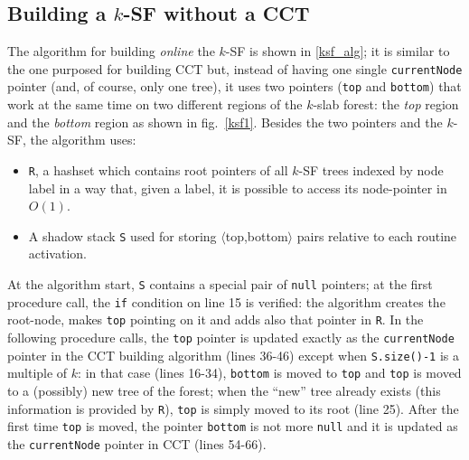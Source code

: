 \documentclass[a4paper,10pt]{report}
\begin{document}
\subsection{Building a $k$-SF without a CCT}

The algorithm for building \emph{online} the $k$-SF is shown in \cref{ksf_alg}; 
it is similar to the one purposed for building CCT but, instead of having 
one single \verb|currentNode| pointer (and, of course, only one tree), 
it uses two pointers (\verb|top| and \verb|bottom|) that work at the same time 
on two different regions of the $k$-slab forest: 
the \emph{top} region and the \emph{bottom} region as shown in fig.~\ref{ksf1}.
Besides the two pointers and the $k$-SF, the algorithm uses:

\begin{itemize}
\item \verb|R|, a hashset which contains root pointers of all $k$-SF trees indexed by node label in a way that, given a label, it is possible to access its node-pointer in $O(1)$.

\item A shadow stack \verb|S| used for storing $\langle$top,bottom$\rangle$ pairs relative to each routine activation. 
\end{itemize}

\noindent
At the algorithm start, \verb|S| contains a special pair of \verb|null| pointers; 
at the first procedure call, the \verb|if| condition on line 15 is verified:
the algorithm creates the root-node, makes \verb|top| pointing on it and adds also that pointer in \verb|R|. In the following procedure calls, the \verb|top| pointer is updated exactly as the \verb|currentNode| pointer in the CCT building algorithm (lines 36-46) except when \verb|S.size()-1| is a multiple of $k$: in that case (lines 16-34), \verb|bottom| is moved to \verb|top| and \verb|top| is moved to a (possibly) new tree of the forest; when the ``new'' tree already exists (this information is provided by \verb|R|), \verb|top| is simply moved to its root (line 25). After the first time \verb|top| is moved, the pointer \verb|bottom| is not more \verb|null| and it is updated as the \verb|currentNode| pointer in CCT (lines 54-66). 
\end{document}

